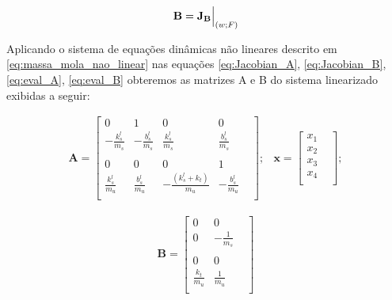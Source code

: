 \documentclass[a4paper]{ifacconf}
\begin{document}
    \begin{equation} \label{eq:eval_B}
        \mathbf{B=J_B} \Bigr\rvert_{(w;F)} \\
    \end{equation}
    
    Aplicando o sistema de equações dinâmicas não lineares descrito em \ref{eq:massa_mola_nao_linear} nas equações \ref{eq:Jacobian_A}, \ref{eq:Jacobian_B}, \ref{eq:eval_A}, \ref{eq:eval_B} obteremos as matrizes A e B do sistema linearizado exibidas a seguir:
    
    
    \begin{equation*} 
    \begin{split}
        \mathbf{A} =
        \begin{bmatrix}
            0 & 1 & 0 & 0 & \\
            -\frac{k_{s}^{l}}{m_s}&-\frac{b_{s}^{l}}{m_s}&\frac{k_{s}^{l}}{m_s}&\frac{b_{s}^{l}}{m_s} &\\ \\
            0 & 0 & 0 & 1 & \\
            \frac{k_{s}^{l}}{m_u}&\frac{b_{s}^{l}}{m_u}&-\frac{(k_{s}^{l}+k_t)}{m_u}&-\frac{b_{s}^{l}}{m_u} &\\
        \end{bmatrix};
    \end{split}
    \begin{split}
       \mathbf{x} = 
        \begin{bmatrix}
             x_1 &\\
             x_2 &\\
             x_3 &\\
             x_4 &\\
        \end{bmatrix}; 
    \end{split}
    \end{equation*}
    
    \begin{equation} 
    \begin{split}
        \mathbf{B} = 
        \begin{bmatrix}
            0 & 0 & \\
            0 & -\frac{1}{m_s}&\\ \\
            0 & 0 & \\
            \frac{k_t}{m_u}&\frac{1}{m_u} \\
        \end{bmatrix}
    \end{split}
    \end{equation}
    
\end{document}
